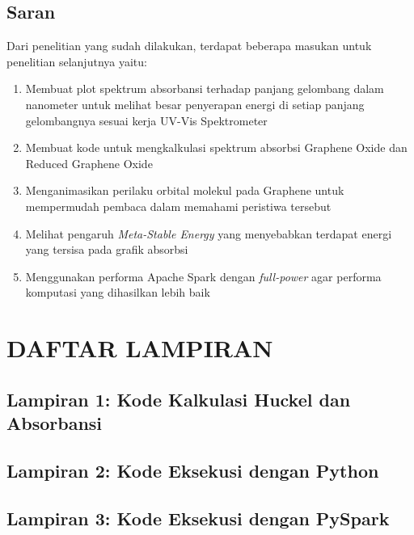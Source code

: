 \documentclass[12pt,a4paper]{report}
\begin{document}
\section{Saran}
	Dari penelitian yang sudah dilakukan, terdapat beberapa masukan untuk penelitian selanjutnya yaitu:
	\begin{enumerate}
		\item Membuat plot spektrum absorbansi terhadap panjang gelombang dalam nanometer untuk melihat besar penyerapan energi di setiap panjang gelombangnya sesuai kerja UV-Vis Spektrometer
		\item Membuat kode untuk mengkalkulasi spektrum absorbsi Graphene Oxide dan Reduced Graphene Oxide
		\item Menganimasikan perilaku orbital molekul pada Graphene untuk mempermudah pembaca dalam memahami peristiwa tersebut
		\item Melihat pengaruh \textit{Meta-Stable Energy} yang menyebabkan terdapat energi yang tersisa pada grafik absorbsi
		\item Menggunakan performa Apache Spark dengan \textit{full-power} agar performa komputasi yang dihasilkan lebih baik
	\end{enumerate}
\printbibliography[title = {DAFTAR PUSTAKA}]
\chapter*{\centering DAFTAR LAMPIRAN }
\thispagestyle{myplain}
\section*{Lampiran 1: Kode Kalkulasi Huckel dan Absorbansi}


\section*{Lampiran 2: Kode Eksekusi dengan Python}


\section*{Lampiran 3: Kode Eksekusi dengan PySpark}

\end{document}
